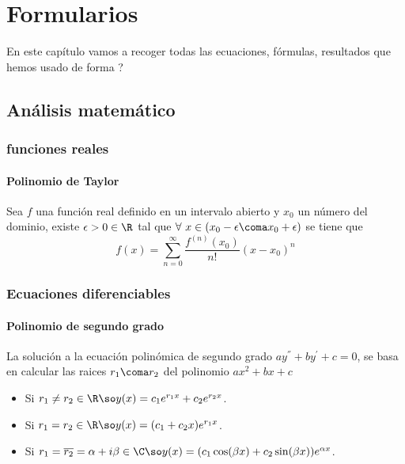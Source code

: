 \chapter{Formularios}\label{ch:formularios}
\begin{summary}
    En este capítulo vamos a recoger todas las ecuaciones, fórmulas, resultados que hemos usado de forma ?
    
    \section{Análisis matemático}\label{sec:analisis-matematico}
    \subsection{funciones reales}\label{subsec:funciones-reales}
    \subsubsection*{Polinomio de Taylor}
    Sea $f$ una función real definido en un intervalo abierto y $x_0$ un número del dominio, existe $\epsilon>0\in\R$ tal que
    $\forall\ x\in(x_0-\epsilon\coma x_0+\epsilon)$ se tiene que
    \begin{equation}
        \label{eq:polinomio-taylor}
        f(x)=\sum_{n=0}^{\infty} \frac{f^{(n)}(x_0)}{n !}(x-x_0)^n
    \end{equation}

    \subsection{Ecuaciones diferenciables}\label{subsec:ecuaciones-diferenciables}
    \subsubsection*{Polinomio de segundo grado}
    La solución a la ecuación polinómica de segundo grado $ay^{''}+by^{'}+c=0$, se basa en calcular las raices $r_1\coma r_2$ del polinomio
    $ax^2+bx+c$
    \begin{itemize}
        \item Si $r_1\neq r_2\in\R\so y(x)=c_{1}e^{r_{1}x}+c_{2}e^{r_{2}x}$.
        \item Si $r_1= r_2\in\R\so y(x)=(c_{1}+c_{2}x)e^{r_{1}x}$.
        \item Si $r_1= \overline{r_2}=\alpha+i\beta\in\C\so y(x)=(c_{1}\cos(\beta x)+c_{2}\sin(\beta x))e^{\alpha x}$.
    \end{itemize}

\end{summary}
